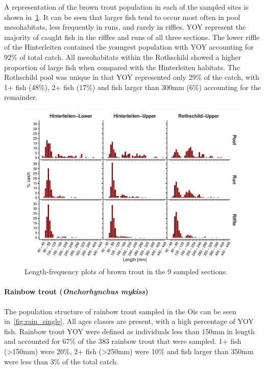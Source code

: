 A representation of the brown trout population in each of the sampled sites is shown in~\cref{fig:brown_mix}.
It can be seen that larger fish tend to occur most often in pool mesohabitats, less frequently in runs, and rarely in riffles. YOY represent the majority of caught fish in the riffles and runs of all three sections. The lower riffle of the Hinterleiten contained the youngest population with YOY accounting for 92\% of total catch. All mesohabitats within the Rothschild showed a higher proportion of large fish when compared with the Hinterleiten habitats. The Rothschild pool was unique in that YOY represented only 29\% of the catch, with 1+ fish (48\%), 2+ fish (17\%) and fish larger than 300mm (6\%) accounting for the remainder.

\begin{figure}[!htb]                              %
	\center
	\includegraphics[width=\textwidth]{images/brown_mix}                %
	\caption{Length-frequency plots of brown trout in the 9 sampled sections.}        %
	\label{fig:brown_mix}                                                       %
\end{figure}


\paragraph{Rainbow trout (\textit{Onchorhynchus mykiss})}\label{sec:ois_rt_lf}

The population structure of rainbow trout sampled in the Ois can be seen in~\cref{fig:rain_single}. All ages classes are present, with a high percentage of YOY fish. Rainbow trout YOY were defined as individuals less than 150mm in length and accounted for 67\% of the 383 rainbow trout that were sampled. 1+ fish (\textgreater150mm) were 20\%, 2+ fish (\textgreater250mm) were 10\% and fish larger than 350mm were less than 3\% of the total catch.

